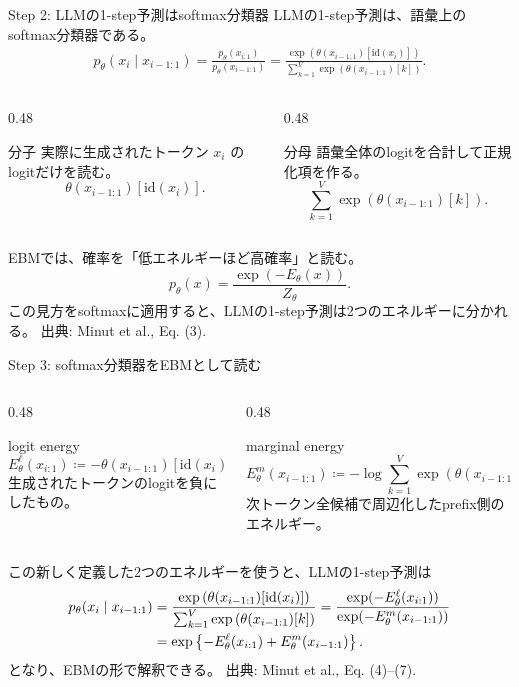 \documentclass[dvipdfmx,uplatex,unicode,9pt,aspectratio=169]{beamer}
\newcommand{\source}[1]{\vfill{\tiny\color{GrayText}出典: #1}}
\newcommand{\El}{E^{\ell}_{\theta}}
\newcommand{\Em}{E^{m}_{\theta}}
\begin{document}
\begin{frame}{Step 2: LLMの1-step予測はsoftmax分類器}
LLMの1-step予測は、語彙上のsoftmax分類器である。
\begin{align}
 p_{\theta}(x_i\mid x_{i-1:1})
 =\frac{p_\theta(x_{i:1})}{p_\theta(x_{i-1:1})}
 = \frac{\exp\left(\theta(x_{i-1:1})[\mathrm{id}(x_i)]\right)}
 {\sum_{k=1}^{V}\exp\left(\theta(x_{i-1:1})[k]\right)}.
 \label{eq:softmax}
\end{align}
\begin{columns}[T,onlytextwidth]
\begin{column}{0.48\linewidth}
\begin{block}{分子}
実際に生成されたトークン $x_i$ のlogitだけを読む。
\[
 \theta(x_{i-1:1})[\mathrm{id}(x_i)].
\]
\end{block}
\end{column}
\begin{column}{0.48\linewidth}
\begin{block}{分母}
語彙全体のlogitを合計して正規化項を作る。
\[
 \sum_{k=1}^{V}\exp(\theta(x_{i-1:1})[k]).
\]
\end{block}
\end{column}
\end{columns}
EBMでは、確率を「低エネルギーほど高確率」と読む。
\[
 p_{\theta}(x)=\frac{\exp(-E_\theta(x))}{Z_\theta}.
\]
この見方をsoftmaxに適用すると、LLMの1-step予測は2つのエネルギーに分かれる。
\source{Minut et al., Eq. (3).}
\end{frame}

\begin{frame}{Step 3: softmax分類器をEBMとして読む}

\begin{columns}[T,onlytextwidth]
\begin{column}{0.48\linewidth}
\begin{block}{logit energy}
\[
 \El(x_{i:1})
 \coloneqq -\theta(x_{i-1:1})[\mathrm{id}(x_i)].
\]
生成されたトークンのlogitを負にしたもの。
\end{block}
\end{column}
\begin{column}{0.48\linewidth}
\begin{block}{marginal energy}
\[
 \Em(x_{i-1:1})
 \coloneqq -\log\sum_{k=1}^{V}\exp(\theta(x_{i-1:1})[k]).
\]
次トークン全候補で周辺化したprefix側のエネルギー。
\end{block}
\end{column}
\end{columns}
この新しく定義した2つのエネルギーを使うと、LLMの1-step予測は
\begin{align}
  p_{\theta}(x_i\mid x_{i-1:1})
  &= \frac{\exp\left(\theta(x_{i-1:1})[\mathrm{id}(x_i)]\right)}
 {\sum_{k=1}^{V}\exp\left(\theta(x_{i-1:1})[k]\right)} = \frac{\exp(-\El(x_{i:1}))}{\exp(-\Em(x_{i-1:1}))} \notag \\
  &= \exp\left\{-\El(x_{i:1})+\Em(x_{i-1:1})\right\}.
  \label{eq:ebm_form}
\end{align}
となり、EBMの形で解釈できる。
\source{Minut et al., Eq. (4)--(7).}
\end{frame}
\end{document}
